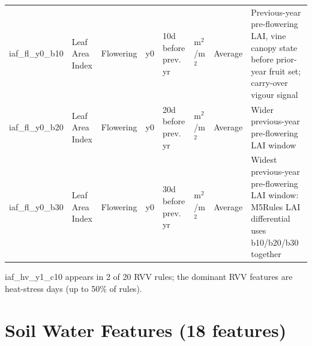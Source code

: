 {\begin{longtable}{p{2.2cm}|p{1.5cm}|p{1.2cm}|p{0.4cm}|p{1.4cm}|p{0.7cm}|p{0.9cm}|p{4.8cm}}
iaf\_fl\_y0\_b10 & Leaf Area Index & Flowering & y0 & 10d before prev. yr & m$^2$/m$^2$ & Average & Previous-year pre-flowering LAI, vine canopy state before prior-year fruit set; carry-over vigour signal \\
iaf\_fl\_y0\_b20 & Leaf Area Index & Flowering & y0 & 20d before prev. yr & m$^2$/m$^2$ & Average & Wider previous-year pre-flowering LAI window \\
iaf\_fl\_y0\_b30 & Leaf Area Index & Flowering & y0 & 30d before prev. yr & m$^2$/m$^2$ & Average & Widest previous-year pre-flowering LAI window: M5Rules LAI differential uses b10/b20/b30 together \\
\end{longtable}
}

iaf\_hv\_y1\_c10 appears in 2 of 20 RVV rules; the dominant RVV features are heat-stress days (up to 50\% of rules).


\section{Soil Water Features (18 features)}\label{app_sec:soil_water_features_18}

